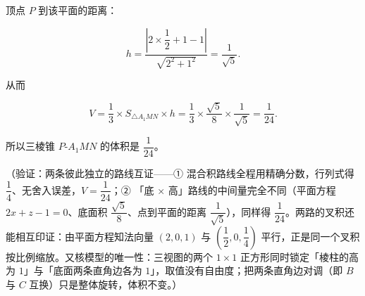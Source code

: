 \begin{answer}
顶点 \(P\) 到该平面的距离：

\nopagebreak[4]
\[
h=\frac{\left|2\times\dfrac{1}{2}+1-1\right|}{\sqrt{2^{2}+1^{2}}}=\frac{1}{\sqrt{5}}.
\]

从而

\nopagebreak[4]
\[
V=\frac{1}{3}\times S_{\triangle A_1MN}\times h=\frac{1}{3}\times\frac{\sqrt{5}}{8}\times\frac{1}{\sqrt{5}}=\frac{1}{24}.
\]

所以三棱锥 \(P\text{-}A_1MN\) 的体积是 \(\dfrac{1}{24}\)。

（验证：两条彼此独立的路线互证——① 混合积路线全程用精确分数，行列式得 \(\dfrac{1}{4}\)、无舍入误差，\(V=\dfrac{1}{24}\)；② 「底 × 高」路线的中间量完全不同（平面方程 \(2x+z-1=0\)、底面积 \(\dfrac{\sqrt{5}}{8}\)、点到平面的距离 \(\dfrac{1}{\sqrt{5}}\)），同样得 \(\dfrac{1}{24}\)。两路的叉积还能相互印证：由平面方程知法向量 \((2,0,1)\) 与 \(\left(\dfrac{1}{2},0,\dfrac{1}{4}\right)\) 平行，正是同一个叉积按比例缩放。又核模型的唯一性：三视图的两个 \(1\times1\) 正方形同时锁定「棱柱的高为 \(1\)」与「底面两条直角边各为 \(1\)」，取值没有自由度；把两条直角边对调（即 \(B\) 与 \(C\) 互换）只是整体旋转，体积不变。）


\end{answer}
